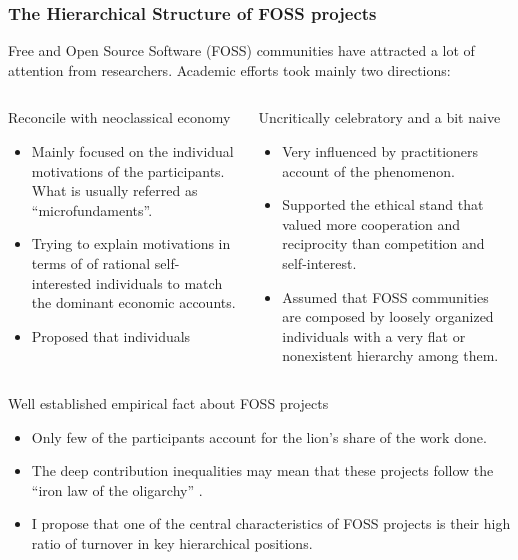 \documentclass[ignorenonframetext,red,8pt,notes=show]{beamer}
\begin{document}
\begin{frame}
\frametitle{The Hierarchical Structure of FOSS projects}

Free and Open Source Software (FOSS) communities have attracted a lot of attention from researchers. Academic efforts took mainly two directions:

\begin{columns}[c]
\begin{column}{0.5\textwidth}
\begin{block}{Reconcile with neoclassical economy}
\begin{itemize}
\item Mainly focused on the individual motivations of the participants. What is usually referred as ``microfundaments''.
\item Trying to explain motivations in terms of of rational self-interested individuals to match the dominant economic accounts.
\item Proposed that individuals 
\end{itemize}
\end{block}
\end{column}

\begin{column}{0.5\textwidth}

\begin{block}{Uncritically celebratory and a bit naive}
\begin{itemize}
\item Very influenced by practitioners account of the phenomenon.
\item Supported the ethical stand that valued more cooperation and reciprocity than competition and self-interest.
\item Assumed that FOSS communities are composed by loosely organized individuals with a very flat or nonexistent hierarchy among them.
\end{itemize}
\end{block}
\end{column}
\end{columns}


\begin{block}{Well established empirical fact about FOSS projects}
\begin{itemize}
\item Only few of the participants account for the lion's share of the work done.
\item The deep contribution inequalities may mean that these projects follow the ``iron law of the oligarchy'' \citep{shaw:2014}.
\item I propose that one of the central characteristics of FOSS projects is their high ratio of turnover in key hierarchical positions.
\end{itemize}
\end{block}

\end{frame}
\end{document}

